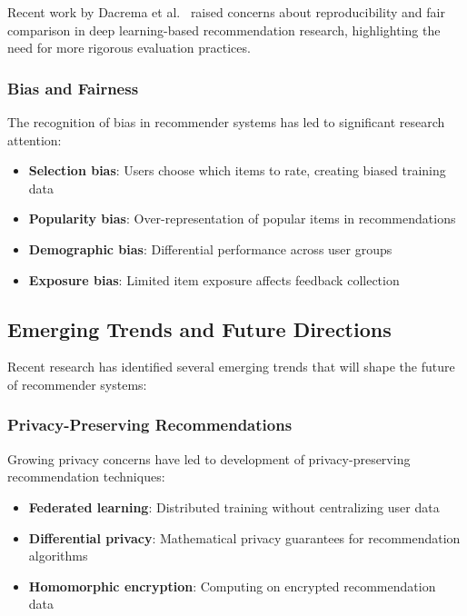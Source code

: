Recent work by Dacrema et al.~\cite{dacrema2019we} raised concerns about reproducibility and fair comparison in deep learning-based recommendation research, highlighting the need for more rigorous evaluation practices.

\subsubsection{Bias and Fairness}
The recognition of bias in recommender systems has led to significant research attention:
\begin{itemize}
    \item \textbf{Selection bias}: Users choose which items to rate, creating biased training data~\cite{marlin2007collaborative}
    \item \textbf{Popularity bias}: Over-representation of popular items in recommendations~\cite{abdollahpouri2019unfairness}
    \item \textbf{Demographic bias}: Differential performance across user groups~\cite{ekstrand2022fairness}
    \item \textbf{Exposure bias}: Limited item exposure affects feedback collection~\cite{joachims2017accurately}
\end{itemize}

\subsection{Emerging Trends and Future Directions}

Recent research has identified several emerging trends that will shape the future of recommender systems:

\subsubsection{Privacy-Preserving Recommendations}
Growing privacy concerns have led to development of privacy-preserving recommendation techniques:
\begin{itemize}
    \item \textbf{Federated learning}: Distributed training without centralizing user data~\cite{chai2020secure}
    \item \textbf{Differential privacy}: Mathematical privacy guarantees for recommendation algorithms~\cite{mcsherry2009differentially}
    \item \textbf{Homomorphic encryption}: Computing on encrypted recommendation data~\cite{erkin2012privacy}
\end{itemize}

